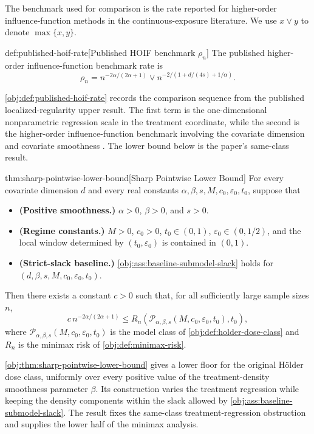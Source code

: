 \documentclass[11pt]{article}
\begin{document}
The benchmark used for comparison is the rate reported for higher-order influence-function methods in the continuous-exposure literature. We use \(x\vee y\) to denote \(\max\{x,y\}\).

\begin{definitionv}{def:published-hoif-rate}[Published HOIF benchmark $\rho_n$]
The published higher-order influence-function benchmark rate is
\[
\rho_n
=
n^{-2\alpha/(2\alpha+1)}
\vee
n^{-2/(1+d/(4s)+1/\alpha)} .
\]
\end{definitionv}

\cref{obj:def:published-hoif-rate} records the comparison sequence from the published localized-regularity upper result. The first term is the one-dimensional nonparametric regression scale in the treatment coordinate, while the second is the higher-order influence-function benchmark involving the covariate dimension and covariate smoothness \citep{robins2008,robins2015,kennedy2017,bonvini2022}. The lower bound below is the paper's same-class result.

\begin{theoremv}{thm:sharp-pointwise-lower-bound}[Sharp Pointwise Lower Bound]
For every covariate dimension $d$ and every real constants
$\alpha,\beta,s,M,c_0,\varepsilon_0,t_0$, suppose that
\begin{itemize}
\item \textbf{(Positive smoothness.)} $\alpha>0$, $\beta>0$, and $s>0$.
\item \textbf{(Regime constants.)} $M>0$, $c_0>0$, $t_0\in(0,1)$, $\varepsilon_0\in(0,1/2)$, and the local window determined by $(t_0,\varepsilon_0)$ is contained in $(0,1)$.
\item \textbf{(Strict-slack baseline.)} \cref{obj:ass:baseline-submodel-slack} holds for $(d,\beta,s,M,c_0,\varepsilon_0,t_0)$.
\end{itemize}
Then there exists a constant $c>0$ such that, for all sufficiently large sample sizes $n$,
\[
  c\, n^{-2\alpha/(2\alpha+1)}
  \le
  R_n\!\left(
    \mathcal P_{\alpha,\beta,s}(M,c_0,\varepsilon_0,t_0),
    t_0
  \right),
\]
where $\mathcal P_{\alpha,\beta,s}(M,c_0,\varepsilon_0,t_0)$ is the model class of \cref{obj:def:holder-dose-class} and $R_n$ is the minimax risk of \cref{obj:def:minimax-risk}.
\end{theoremv}

\cref{obj:thm:sharp-pointwise-lower-bound} gives a lower floor for the original Hölder dose class, uniformly over every positive value of the treatment-density smoothness parameter \(\beta\). Its construction varies the treatment regression while keeping the density components within the slack allowed by \cref{obj:ass:baseline-submodel-slack}. The result fixes the same-class treatment-regression obstruction and supplies the lower half of the minimax analysis.
\end{document}
